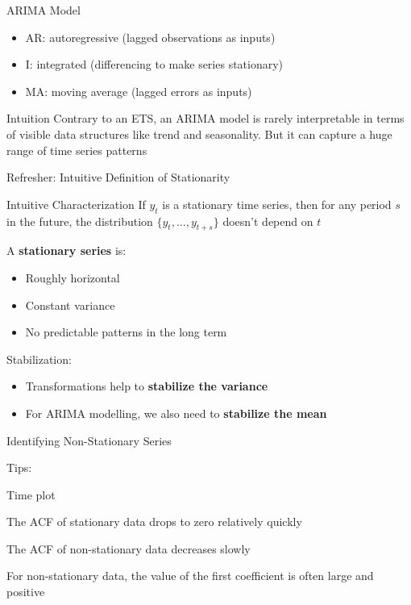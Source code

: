 \documentclass{beamer}
\newenvironment{wideitemize}{\itemize\addtolength{\itemsep}{10pt}}{\enditemize}
\begin{document}
\begin{frame}{ARIMA Model}

  \begin{itemize}
  \item AR: autoregressive (lagged observations as inputs)
  \item I: integrated (differencing to make series stationary)
  \item MA: moving average (lagged errors as inputs)
  \end{itemize}

  \begin{block}{Intuition}
    Contrary to an ETS, an ARIMA model is rarely interpretable in terms of visible data structures like trend and seasonality. But it can capture a huge range of time series patterns
  \end{block}  
\end{frame}


\begin{frame}{Refresher: Intuitive Definition of Stationarity}

  \begin{block}{Intuitive Characterization}
    If ${y_t}$ is a stationary time series, then for any period $s$ in the future, the distribution $\{y_t, \dots, y_{t+s}\}$ doesn't depend on $t$
  \end{block}

  A \textbf{stationary series} is:
  \begin{itemize}
  \item Roughly horizontal
  \item Constant variance
  \item No predictable patterns in the long term
  \end{itemize}

  Stabilization: 
  \begin{itemize}
  \item Transformations help to \textbf{stabilize the variance}
  \item For ARIMA modelling, we also need to \textbf{stabilize the mean}
  \end{itemize}
  
\end{frame}


\begin{frame}{Identifying Non-Stationary Series}

  Tips:\\
  
  \begin{wideitemize}
  \item Time plot
  \item The ACF of stationary data drops to zero relatively quickly
  \item The ACF of non-stationary data decreases slowly
  \item For non-stationary data, the value of the first coefficient is often large and positive
  \end{wideitemize}

  
\end{frame}
\end{document}

